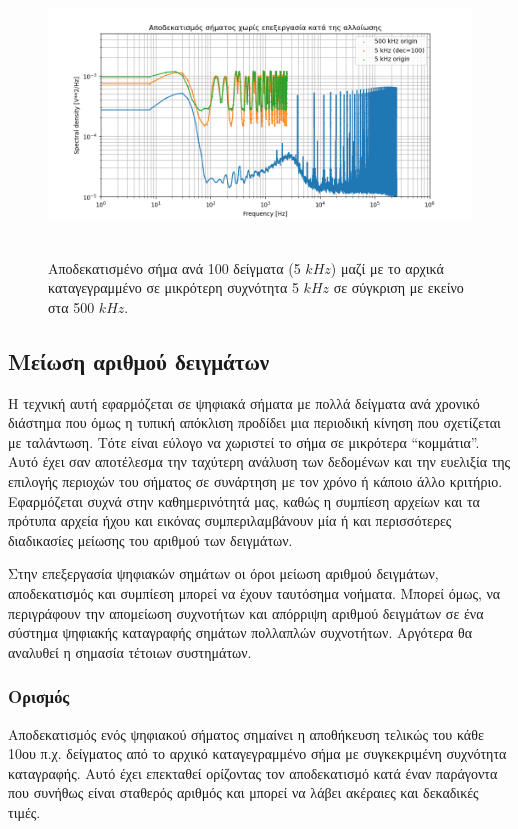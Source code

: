 \documentclass[breaklines=true, 12pt]{article}
\begin{document}
{{{\begin{figure}[htbp]
\centering
\includegraphics[width=500px,height=280px]{./decimation/with_aliasing.png}
\caption{Αποδεκατισμένο σήμα ανά 100 δείγματα (5 \(kHz\)) μαζί με το αρχικά καταγεγραμμένο σε μικρότερη συχνότητα 5 \(kHz\) σε σύγκριση με εκείνο στα 500 \(kHz\).}
\end{figure}
\subsection{Μείωση αριθμού δειγμάτων}
\label{sec:orgc8da0ee}
Η τεχνική αυτή εφαρμόζεται σε ψηφιακά σήματα με πολλά δείγματα ανά
χρονικό διάστημα που όμως η τυπική απόκλιση προδίδει μια περιοδική
κίνηση που σχετίζεται με ταλάντωση. Τότε είναι εύλογο να χωριστεί το
σήμα σε μικρότερα “κομμάτια”. Αυτό έχει σαν αποτέλεσμα την ταχύτερη
ανάλυση των δεδομένων και την ευελιξία της επιλογής περιοχών του σήματος σε
συνάρτηση με τον χρόνο ή κάποιο άλλο κριτήριο. Εφαρμόζεται συχνά στην
καθημερινότητά μας, καθώς η συμπίεση αρχείων και τα πρότυπα αρχεία ήχου
και εικόνας συμπεριλαμβάνουν μία ή και περισσότερες διαδικασίες μείωσης
του αριθμού των δειγμάτων.

Στην επεξεργασία ψηφιακών σημάτων οι όροι μείωση αριθμού δειγμάτων,
αποδεκατισμός και συμπίεση μπορεί να έχουν ταυτόσημα νοήματα. Μπορεί όμως,
να περιγράφουν την απομείωση συχνοτήτων και απόρριψη αριθμού δειγμάτων σε
ένα σύστημα ψηφιακής καταγραφής σημάτων πολλαπλών συχνοτήτων. Αργότερα
θα αναλυθεί η σημασία τέτοιων συστημάτων.
\subsubsection{Ορισμός}
\label{sec:org4493685}
Αποδεκατισμός ενός ψηφιακού σήματος σημαίνει η αποθήκευση τελικώς του
κάθε 10ου π.χ. δείγματος από το αρχικό καταγεγραμμένο σήμα με συγκεκριμένη
συχνότητα καταγραφής. Αυτό έχει επεκταθεί ορίζοντας τον αποδεκατισμό
κατά έναν παράγοντα που συνήθως είναι σταθερός αριθμός και μπορεί να
λάβει ακέραιες και δεκαδικές τιμές.

}}}
\end{document}
